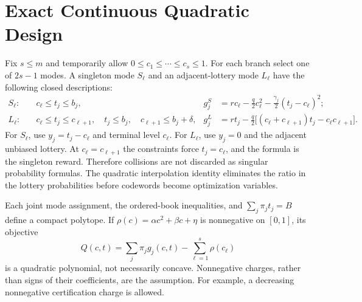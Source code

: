 \section{Exact Continuous Quadratic Design}\label{app:r45-continuous}
Fix $s\leq m$ and temporarily allow $0\leq c_1\leq\cdots\leq c_s\leq1$. For each branch select one of $2s-1$ modes. A singleton mode $S_\ell$ and an adjacent-lottery mode $L_\ell$ have the following closed descriptions:
\begin{align}
 S_\ell:\quad&c_\ell\leq t_j\leq b_j,
 &g_j^S&=rc_\ell-\frac q2c_\ell^2-\frac{\gamma_j}{2}(t_j-c_\ell)^2;\label{eq:singleton-cell}\\
 L_\ell:\quad&c_\ell\leq t_j\leq c_{\ell+1},\quad t_j\leq b_j,\quad
 c_{\ell+1}\leq b_j+\delta,
 &g_j^L&=rt_j-\frac q2\bigl[(c_\ell+c_{\ell+1})t_j-c_\ell c_{\ell+1}\bigr].\label{eq:lottery-cell}
\end{align}
For $S_\ell$, use $y_j=t_j-c_\ell$ and terminal level $c_\ell$. For $L_\ell$, use $y_j=0$ and the adjacent unbiased lottery. At $c_\ell=c_{\ell+1}$ the constraints force $t_j=c_\ell$, and the formula is the singleton reward. Therefore collisions are not discarded as singular probability formulas. The quadratic interpolation identity eliminates the ratio in the lottery probabilities before codewords become optimization variables.

Each joint mode assignment, the ordered-book inequalities, and $\sum_j\pi_jt_j=B$ define a compact polytope. If $\rho(c)=\alpha c^2+\beta c+\eta$ is nonnegative on $[0,1]$, its objective
\begin{equation}\label{eq:cell-objective}
 Q(c,t)=\sum_j\pi_jg_j(c,t)-\sum_{\ell=1}^s\rho(c_\ell)
\end{equation}
is a quadratic polynomial, not necessarily concave. Nonnegative charges, rather than signs of their coefficients, are the assumption. For example, a decreasing nonnegative certification charge is allowed.

